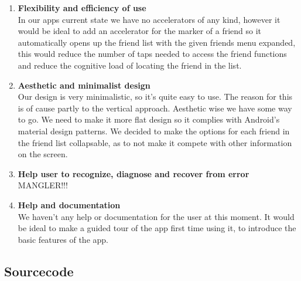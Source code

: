 \documentclass[runningheads,a4paper]{llncs}
\begin{document}
\begin{enumerate}
\item \textbf{Flexibility and efficiency of use}\\
In our apps current state we have no accelerators of any kind, however it would be ideal to add an accelerator for the marker of a friend so it automatically opens up the friend list with the given friends menu expanded, this would reduce the number of taps needed to access the friend functions and reduce the cognitive load of locating the friend in the list.
\item \textbf{Aesthetic and minimalist design
}\\
Our design is very minimalistic, so it’s quite easy to use. The reason for this is of cause partly to the vertical approach. 
Aesthetic wise we have some way to go. We need to make it more flat design so it complies with Android's material design patterns.
We decided to make the options for each friend in the friend list collapsable, as to not make it compete with other information on the screen.
\item \textbf{Help user to recognize, diagnose and recover from error}\\
MANGLER!!!
\item \textbf{Help and documentation}\\
We haven’t any help or documentation for the user at this moment. It would be ideal to make a guided tour of the app first time using it, to introduce the basic features of the app. 


\end{enumerate}


\subsection*{Sourcecode}
\lstset{numbers=left,
tabsize=2, numbersep=10pt,
  title=\lstname }

\end{document}
